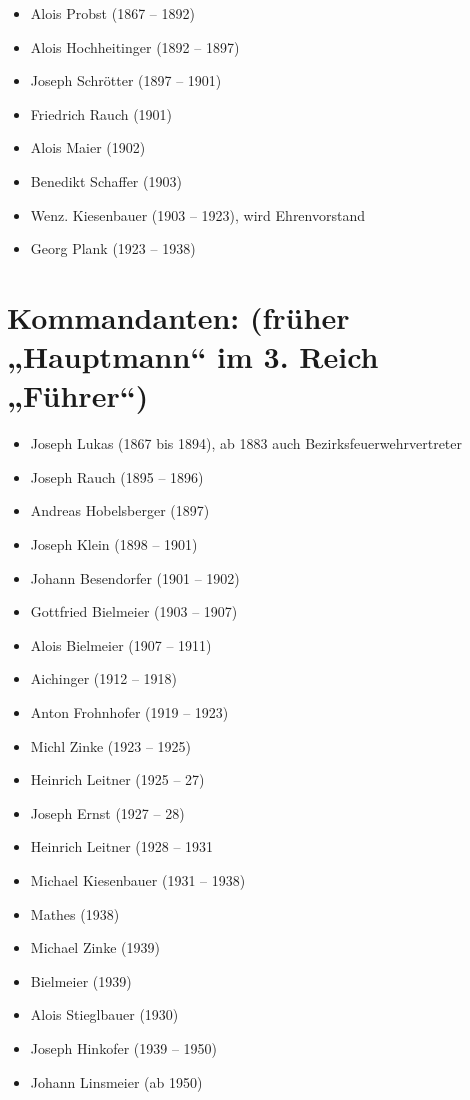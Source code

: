 \documentclass[12pt,a4paper]{book}
\begin{document}
\begin{itemize}
  \item Alois Probst (1867 – 1892)
  \item Alois Hochheitinger (1892 – 1897)
  \item Joseph Schrötter (1897 – 1901)
  \item Friedrich Rauch (1901)
  \item Alois Maier (1902)
  \item Benedikt Schaffer (1903)
  \item Wenz. Kiesenbauer (1903 – 1923), wird Ehrenvorstand
  \item Georg Plank (1923 – 1938)
\end{itemize}

\section{Kommandanten: (früher „Hauptmann“ im 3. Reich „Führer“)}

\begin{itemize}
  \item Joseph Lukas (1867 bis 1894), ab 1883 auch Bezirksfeuerwehrvertreter
  \item Joseph Rauch (1895 – 1896)
  \item Andreas Hobelsberger (1897)
  \item Joseph Klein (1898 – 1901)
  \item Johann Besendorfer (1901 – 1902)
  \item Gottfried Bielmeier (1903 – 1907)
  \item Alois Bielmeier (1907 – 1911)
  \item Aichinger (1912 – 1918)
  \item Anton Frohnhofer (1919 – 1923)
  \item Michl Zinke (1923 – 1925)
  \item Heinrich Leitner (1925 – 27)
  \item Joseph Ernst (1927 – 28)
  \item Heinrich Leitner (1928 – 1931
  \item Michael Kiesenbauer (1931 – 1938)
  \item Mathes (1938)
  \item Michael Zinke (1939)
  \item Bielmeier (1939)
  \item Alois Stieglbauer (1930)
  \item Joseph Hinkofer (1939 – 1950)
  \item Johann Linsmeier (ab 1950)
\end{itemize}
\end{document}
